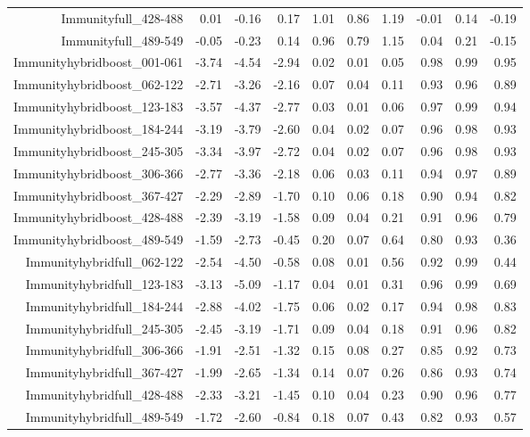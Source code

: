 \begin{table}[ht]
\begin{tabular}{rrrrrrrrrr}
  Immunityfull\_428-488 & 0.01 & -0.16 & 0.17 & 1.01 & 0.86 & 1.19 & -0.01 & 0.14 & -0.19 \\ 
  Immunityfull\_489-549 & -0.05 & -0.23 & 0.14 & 0.96 & 0.79 & 1.15 & 0.04 & 0.21 & -0.15 \\ 
  Immunityhybridboost\_001-061 & -3.74 & -4.54 & -2.94 & 0.02 & 0.01 & 0.05 & 0.98 & 0.99 & 0.95 \\ 
  Immunityhybridboost\_062-122 & -2.71 & -3.26 & -2.16 & 0.07 & 0.04 & 0.11 & 0.93 & 0.96 & 0.89 \\ 
  Immunityhybridboost\_123-183 & -3.57 & -4.37 & -2.77 & 0.03 & 0.01 & 0.06 & 0.97 & 0.99 & 0.94 \\ 
  Immunityhybridboost\_184-244 & -3.19 & -3.79 & -2.60 & 0.04 & 0.02 & 0.07 & 0.96 & 0.98 & 0.93 \\ 
  Immunityhybridboost\_245-305 & -3.34 & -3.97 & -2.72 & 0.04 & 0.02 & 0.07 & 0.96 & 0.98 & 0.93 \\ 
  Immunityhybridboost\_306-366 & -2.77 & -3.36 & -2.18 & 0.06 & 0.03 & 0.11 & 0.94 & 0.97 & 0.89 \\ 
  Immunityhybridboost\_367-427 & -2.29 & -2.89 & -1.70 & 0.10 & 0.06 & 0.18 & 0.90 & 0.94 & 0.82 \\ 
  Immunityhybridboost\_428-488 & -2.39 & -3.19 & -1.58 & 0.09 & 0.04 & 0.21 & 0.91 & 0.96 & 0.79 \\ 
  Immunityhybridboost\_489-549 & -1.59 & -2.73 & -0.45 & 0.20 & 0.07 & 0.64 & 0.80 & 0.93 & 0.36 \\ 
  Immunityhybridfull\_062-122 & -2.54 & -4.50 & -0.58 & 0.08 & 0.01 & 0.56 & 0.92 & 0.99 & 0.44 \\ 
  Immunityhybridfull\_123-183 & -3.13 & -5.09 & -1.17 & 0.04 & 0.01 & 0.31 & 0.96 & 0.99 & 0.69 \\ 
  Immunityhybridfull\_184-244 & -2.88 & -4.02 & -1.75 & 0.06 & 0.02 & 0.17 & 0.94 & 0.98 & 0.83 \\ 
  Immunityhybridfull\_245-305 & -2.45 & -3.19 & -1.71 & 0.09 & 0.04 & 0.18 & 0.91 & 0.96 & 0.82 \\ 
  Immunityhybridfull\_306-366 & -1.91 & -2.51 & -1.32 & 0.15 & 0.08 & 0.27 & 0.85 & 0.92 & 0.73 \\ 
  Immunityhybridfull\_367-427 & -1.99 & -2.65 & -1.34 & 0.14 & 0.07 & 0.26 & 0.86 & 0.93 & 0.74 \\ 
  Immunityhybridfull\_428-488 & -2.33 & -3.21 & -1.45 & 0.10 & 0.04 & 0.23 & 0.90 & 0.96 & 0.77 \\ 
  Immunityhybridfull\_489-549 & -1.72 & -2.60 & -0.84 & 0.18 & 0.07 & 0.43 & 0.82 & 0.93 & 0.57 \\ 

\end{tabular}
\end{table}
